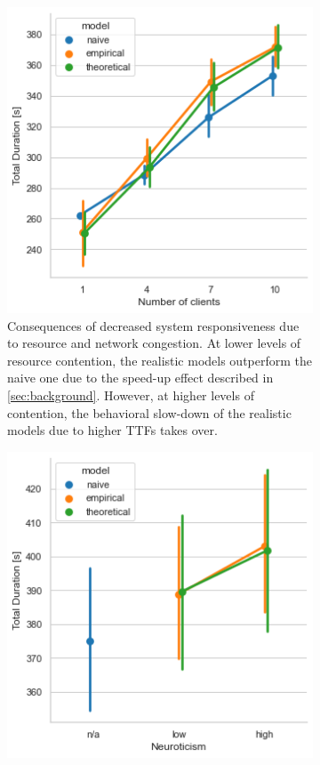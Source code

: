 \begin{figure}
    \centering
    \begin{subfigure}[t]{\columnwidth}
        \centering
        \includegraphics[width=.8\textwidth]{figs/numclients_vs_duration.png}
        \caption{%
            Consequences of decreased system responsiveness due to resource and network congestion.
            At lower levels of resource contention, the realistic models outperform the naive one due to the speed-up effect described in \cref{sec:background}.
            However, at higher levels of contention, the behavioral slow-down of the realistic models due to higher \glspl{TTF} takes over.
        }\label{fig:scaling_duration}
    \end{subfigure}%
    \hspace{\fill}%
    \begin{subfigure}[t]{\columnwidth}
        \centering
        \includegraphics[width=.8\textwidth]{figs/neuroticism_vs_duration.png}

\end{subfigure}
\end{figure}
